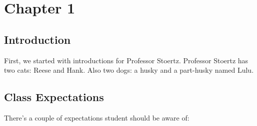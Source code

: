\documentclass[10pt]{paper}
\begin{document}
\small

\section{Chapter 1}

\subsection*{Introduction}
First, we started with introductions for Professor Stoertz. Professor Stoertz has two cats: Reese and Hank. Also two dogs: a husky and a part-husky named Lulu.
\subsection*{Class Expectations}
There's a couple of expectations student should be aware of:
\end{document}
